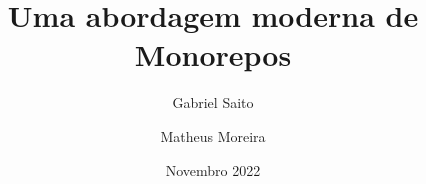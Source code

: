 \documentclass[12pt]{article}
\title{Uma abordagem moderna de Monorepos}
\author{Gabriel Saito \and Matheus Moreira}
\date{Novembro 2022}
\begin{document}
  \maketitle

  \newpage
  \tableofcontents
  \onehalfspacing

  \nocite{*}

  

  
  
  
  
  
  
  

  \newpage
  \printbibliography
\end{document}
